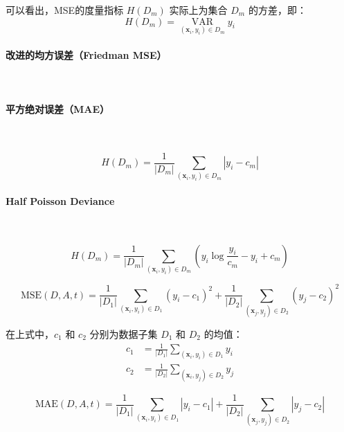 \documentclass{ctexart}
\numberwithin{equation}{section}
\begin{document}
可以看出，MSE的度量指标 $H(D_m)$ 实际上为集合 $D_m$ 的方差，即：
\begin{equation}
	H(D_m) = \mathop{\text{VAR}}\limits_{(\boldsymbol{x}_i, y_i) \in D_m} y_i
\end{equation}

\paragraph{改进的均方误差（Friedman MSE）}~{}




\paragraph{平方绝对误差（MAE）}~{}

\begin{equation}
	H(D_m) = \frac{1}{|D_m|} \sum_{(\boldsymbol{x}_i, y_i) \in D_m} |y_i - c_m|
\end{equation}


\paragraph{Half Poisson Deviance}~{}

\begin{equation}
	H(D_m) = \frac{1}{|D_m|} \sum_{(\boldsymbol{x}_i, y_i) \in D_m} \left( y_i \log \frac{y_i}{c_m} - y_i + c_m \right)
\end{equation}



\begin{equation}
	\text{MSE}(D,A,t) = \frac{1}{|D_1|} \sum_{(\boldsymbol{x}_i, y_i) \in D_1} (y_i-c_1)^2 + \frac{1}{|D_2|} \sum_{(\boldsymbol{x}_j, y_j) \in D_2} (y_j-c_2)^2
\end{equation}

在上式中，$c_1$ 和 $c_2$ 分别为数据子集 $D_1$ 和 $D_2$ 的均值：
\begin{subequations}
	\begin{align}
		c_1 &= \frac{1}{|D_1|} \sum_{(\boldsymbol{x}_i, y_i) \in D_1} y_i \\
		c_2 &= \frac{1}{|D_2|} \sum_{(\boldsymbol{x}_i, y_j) \in D_2} y_j
	\end{align}
\end{subequations}

\begin{equation}
	\text{MAE}(D,A,t) = \frac{1}{|D_1|} \sum_{(\boldsymbol{x}_i, y_i) \in D_1} |y_i-c_1| + \frac{1}{|D_2|} \sum_{(\boldsymbol{x}_j, y_j) \in D_2} |y_j-c_2|
\end{equation}
\end{document}
